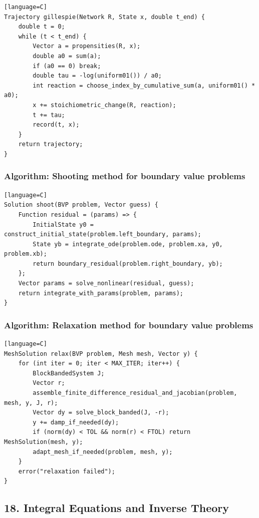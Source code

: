 \documentclass[11pt]{article}
\begin{document}
\begin{verbatim}[language=C]
Trajectory gillespie(Network R, State x, double t_end) {
    double t = 0;
    while (t < t_end) {
        Vector a = propensities(R, x);
        double a0 = sum(a);
        if (a0 == 0) break;
        double tau = -log(uniform01()) / a0;
        int reaction = choose_index_by_cumulative_sum(a, uniform01() * a0);
        x += stoichiometric_change(R, reaction);
        t += tau;
        record(t, x);
    }
    return trajectory;
}
\end{verbatim}

\subsubsection{Algorithm: Shooting method for boundary value problems}\label{algorithm-shooting-method-for-boundary-value-problems}

\begin{verbatim}[language=C]
Solution shoot(BVP problem, Vector guess) {
    Function residual = (params) => {
        InitialState y0 = construct_initial_state(problem.left_boundary, params);
        State yb = integrate_ode(problem.ode, problem.xa, y0, problem.xb);
        return boundary_residual(problem.right_boundary, yb);
    };
    Vector params = solve_nonlinear(residual, guess);
    return integrate_with_params(problem, params);
}
\end{verbatim}

\subsubsection{Algorithm: Relaxation method for boundary value problems}\label{algorithm-relaxation-method-for-boundary-value-problems}

\begin{verbatim}[language=C]
MeshSolution relax(BVP problem, Mesh mesh, Vector y) {
    for (int iter = 0; iter < MAX_ITER; iter++) {
        BlockBandedSystem J;
        Vector r;
        assemble_finite_difference_residual_and_jacobian(problem, mesh, y, J, r);
        Vector dy = solve_block_banded(J, -r);
        y += damp_if_needed(dy);
        if (norm(dy) < TOL && norm(r) < FTOL) return MeshSolution(mesh, y);
        adapt_mesh_if_needed(problem, mesh, y);
    }
    error("relaxation failed");
}
\end{verbatim}

\subsection{18. Integral Equations and Inverse Theory}\label{integral-equations-and-inverse-theory}
\end{document}
